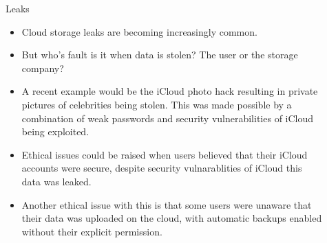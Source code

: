 \documentclass[final]{beamer}
\newlength{\sepwid}
\newlength{\onecolwid}
\newlength{\twocolwid}
\begin{document}
\begin{frame}[t]
\begin{columns}[t]
\begin{column}{\onecolwid}
\begin{block}{Leaks}
\begin{itemize}
\item Cloud storage leaks are becoming increasingly common.
\item But who's fault is it when data is stolen? The user or the storage company?
\item A recent example would be the iCloud photo hack resulting in private pictures of celebrities being stolen. This was made possible by a combination of weak passwords and security vulnerabilities of iCloud being exploited. 
\item Ethical issues could be raised when users believed that their iCloud accounts were secure, despite security vulnarablities of iCloud this data was leaked. 
\item Another ethical issue with this is that some users were unaware that their data was uploaded on the cloud, with automatic backups enabled without their explicit permission.
\end{itemize}

\end{block}





\end{column} %

\begin{column}{\sepwid}\end{column} %

\begin{column}{\twocolwid} %

\begin{columns}[t,totalwidth=\twocolwid] %

\begin{column}{\onecolwid}\vspace{-.6in} %



\end{column}
\end{columns}
\end{column}
\end{columns}
\end{frame}
\end{document}
